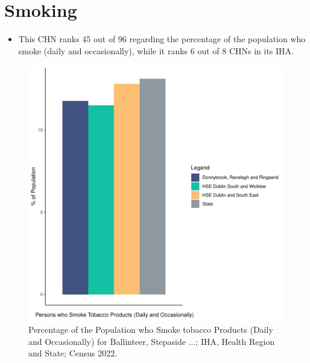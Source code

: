 \documentclass{article}
\begin{document}
\pagebreak

\section{Smoking}\label{sect:Smoking}
\begin{itemize}
\item This CHN ranks  45 out of 96 regarding the percentage of the population who smoke (daily and occasionally), while it ranks   6 out of 8 CHNs in its IHA.
\end{itemize}
\begin{figure}[H]
	\centering
	\includegraphics[width = 120mm]{../figures/SmokingED.pdf}
	\caption{Percentage of the Population who Smoke tobacco Products (Daily and Occasionally) for Ballinteer, Stepaside ...; IHA, Health Region and State; Census 2022.}
	\label{fig:2ae19629-1a6a-13a3-e055-000000000001}
	\end{figure}
	
\end{document}
